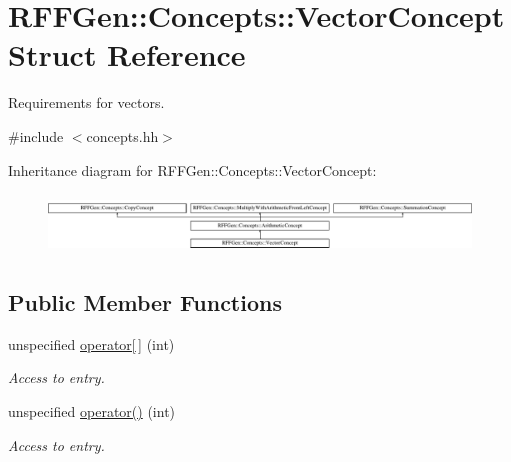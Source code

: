 \hypertarget{structRFFGen_1_1Concepts_1_1VectorConcept}{\section{R\-F\-F\-Gen\-:\-:Concepts\-:\-:Vector\-Concept Struct Reference}
\label{structRFFGen_1_1Concepts_1_1VectorConcept}
}


Requirements for vectors.  




{\ttfamily \#include $<$concepts.\-hh$>$}

Inheritance diagram for R\-F\-F\-Gen\-:\-:Concepts\-:\-:Vector\-Concept\-:\begin{figure}[H]
\begin{center}
\leavevmode
\includegraphics[height=1.586402cm]{structRFFGen_1_1Concepts_1_1VectorConcept}
\end{center}
\end{figure}
\subsection*{Public Member Functions}
\begin{DoxyCompactItemize}
\item 
\hypertarget{structRFFGen_1_1Concepts_1_1VectorConcept_ae3c1eba9ae7c1789b0261b9c75b45451}{unspecified \hyperlink{structRFFGen_1_1Concepts_1_1VectorConcept_ae3c1eba9ae7c1789b0261b9c75b45451}{operator\mbox{[}$\,$\mbox{]}} (int)}\label{structRFFGen_1_1Concepts_1_1VectorConcept_ae3c1eba9ae7c1789b0261b9c75b45451}

\begin{DoxyCompactList}\small\item\em Access to entry. \end{DoxyCompactList}\item 
\hypertarget{structRFFGen_1_1Concepts_1_1VectorConcept_a1922a4ed887026d05dfc511132d8d0cb}{unspecified \hyperlink{structRFFGen_1_1Concepts_1_1VectorConcept_a1922a4ed887026d05dfc511132d8d0cb}{operator()} (int)}\label{structRFFGen_1_1Concepts_1_1VectorConcept_a1922a4ed887026d05dfc511132d8d0cb}

\begin{DoxyCompactList}\small\item\em Access to entry. \end{DoxyCompactList}\end{DoxyCompactItemize}


